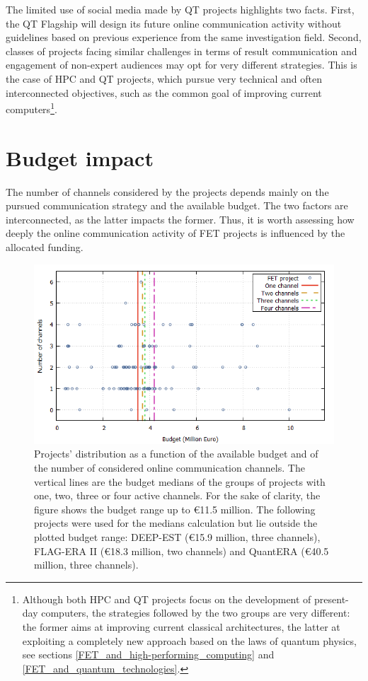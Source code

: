 The limited use of social media made by QT projects highlights two facts. First, the QT Flagship will design its future online communication activity without guidelines based on previous experience from the same investigation field. Second, classes of projects facing similar challenges in terms of result communication and engagement of non-expert audiences may opt for very different strategies. This is the case of HPC and QT projects, which pursue very technical and often interconnected objectives, such as the common goal of improving current computers\footnote{Although both HPC and QT projects focus on the development of present-day computers, the strategies followed by the two groups are very different: the former aims at improving current classical architectures, the latter at exploiting a completely new approach based on the laws of quantum physics, see sections \ref{FET_and_high-performing_computing} and \ref{FET_and_quantum_technologies}.}.

\section{Budget impact} \label{Budget_impact}
The number of channels considered by the projects depends mainly on the pursued communication strategy and the available budget. The two factors are interconnected, as the latter impacts the former. Thus, it is worth assessing how deeply the online communication activity of FET projects is influenced by the allocated funding.  

\begin{figure}[!t] 
 \begin{center}
 \includegraphics[scale=0.5]{Images/Channel_budget.png}
 \caption{Projects' distribution as a function of the available budget and of the number of considered online communication channels. The vertical lines are the budget medians of the groups of projects with one, two, three or four active channels. For the sake of clarity, the figure shows the budget range up to \euro 11.5 million. The following projects were used for the medians calculation but lie outside the plotted budget range:  DEEP-EST (\euro 15.9 million, three channels), FLAG-ERA II (\euro 18.3 million, two channels) and QuantERA (\euro 40.5 million, three channels).}
 \label{Channel_budget}
 \end{center}
\end{figure}


